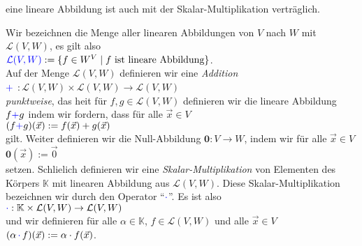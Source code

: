 \begin{Definition}[$\mathcal{L}(V, W)$]
\begin{enumerate}
      eine lineare Abbildung ist auch mit der Skalar-Multiplikation vertr\"{a}glich.
\end{enumerate}
Wir bezeichnen die Menge aller linearen Abbildungen von $V$ nach $W$ mit $\mathcal{L}(V, W)$, es gilt also
\\[0.2cm]
\hspace*{1.3cm}
${\color{blue}\mathcal{L}(V, W)} := \{ f \in W^V \mid \mbox{$f$ ist lineare Abbildung} \}$.
\\[0.2cm]
Auf der Menge $\mathcal{L}(V, W)$ definieren wir eine \emph{\color{blue}Addition}
\\[0.2cm]
\hspace*{1.3cm}
${\color{blue}+}$ $:\mathcal{L}(V, W) \times \mathcal{L}(V, W) \rightarrow \mathcal{L}(V, W)$
\\[0.2cm]
\emph{\color{blue}punktweise}, das hei\3t f\"{u}r $f,g \in \mathcal{L}(V, W)$ definieren wir die
lineare Abbildung $f{\color{blue}+}g$ indem wir fordern, dass f\"{u}r alle $\vec{x} \in V$
\\[0.2cm]
\hspace*{1.3cm}
$(f{\color{blue}+}g)(\vec{x}) := f(\vec{x}) + g(\vec{x})$ 
\\[0.2cm]
gilt.  Weiter definieren wir die Null-Abbildung $\mathbf{0}: V \rightarrow W$, indem wir f\"{u}r alle
$\vec{x} \in V$
\\[0.2cm]
\hspace*{1.3cm}
$\mathbf{0}(\vec{x}) := \vec{0}$
\\[0.2cm]
setzen.  Schlie\3lich definieren wir eine \emph{\color{blue}Skalar-Multiplikation} von Elementen des
K\"{o}rpers  $\mathbb{K}$ mit linearen Abbildung aus $\mathcal{L}(V,W)$.  Diese Skalar-Multiplikation bezeichnen
wir durch den Operator ``$\color{blue}{\cdot}$''.  Es ist also
\\[0.2cm]
\hspace*{1.3cm}
${\color{blue}\cdot}: \mathbb{K} \times \mathcal{L}(V, W) \rightarrow \mathcal{L}(V, W)$
\\[0.2cm]
und wir definieren f\"{u}r alle $\alpha \in \mathbb{K}$, $f \in \mathcal{L}(V, W)$ und alle $\vec{x} \in V$
\\[0.2cm]
\hspace*{1.3cm}
$(\alpha \,{\color{blue}\cdot}\, f)(\vec{x}) := \alpha \cdot f(\vec{x})$.
 \eoxs
\end{Definition}

